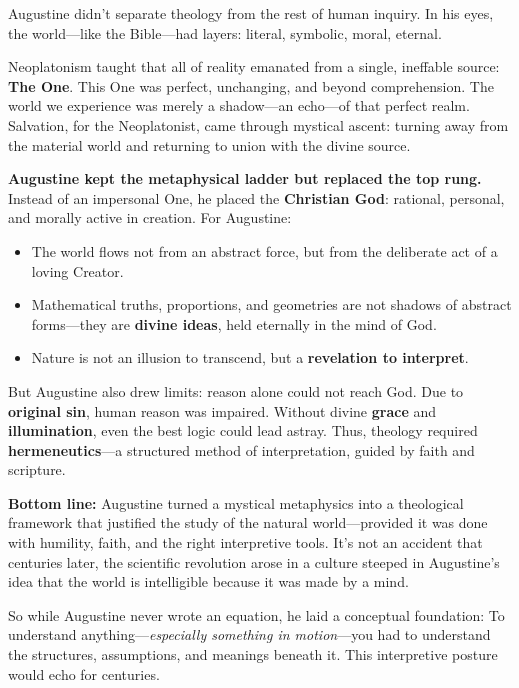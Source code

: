 Augustine didn’t separate theology from the rest of human inquiry. In his eyes, the world—like the Bible—had layers: literal, symbolic, moral, eternal.

Neoplatonism taught that all of reality emanated from a single, ineffable source: \textbf{The One}. This One was perfect, unchanging, and beyond comprehension. The world we experience was merely a shadow—an echo—of that perfect realm. Salvation, for the Neoplatonist, came through mystical ascent: turning away from the material world and returning to union with the divine source.

\textbf{Augustine kept the metaphysical ladder but replaced the top rung.} Instead of an impersonal One, he placed the \textbf{Christian God}: rational, personal, and morally active in creation. For Augustine:

\begin{itemize}
    \item The world flows not from an abstract force, but from the deliberate act of a loving Creator.
    \item Mathematical truths, proportions, and geometries are not shadows of abstract forms—they are \textbf{divine ideas}, held eternally in the mind of God.
    \item Nature is not an illusion to transcend, but a \textbf{revelation to interpret}.
\end{itemize}

But Augustine also drew limits: reason alone could not reach God. Due to \textbf{original sin}, human reason was impaired. Without divine \textbf{grace} and \textbf{illumination}, even the best logic could lead astray. Thus, theology required \textbf{hermeneutics}—a structured method of interpretation, guided by faith and scripture.

\textbf{Bottom line:} Augustine turned a mystical metaphysics into a theological framework that justified the study of the natural world—provided it was done with humility, faith, and the right interpretive tools. It’s not an accident that centuries later, the scientific revolution arose in a culture steeped in Augustine’s idea that the world is intelligible because it was made by a mind.

So while Augustine never wrote an equation, he laid a conceptual foundation:  To understand anything—\textit{especially something in motion}—you had to understand the structures, assumptions, and meanings beneath it.  This interpretive posture would echo for centuries.


